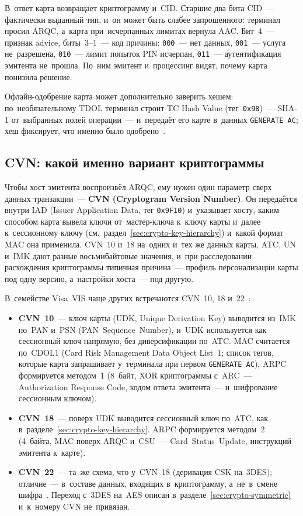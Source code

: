 В~ответ карта возвращает криптограмму и~CID. Старшие два бита CID~--- фактически
выданный тип, и~он может быть слабее запрошенного: терминал просил ARQC,
а~карта при~исчерпанных лимитах вернула AAC. Бит~4~--- признак advice, биты~3--1~---
код причины: \texttt{000}~--- нет данных, \texttt{001}~--- услуга не~разрешена,
\texttt{010}~--- лимит попыток PIN исчерпан, \texttt{011}~--- аутентификация
эмитента не~прошла. По~ним эмитент и~процессинг видят, почему карта понизила
решение.

Офлайн-одобрение карта может дополнительно заверить хешем: по~необязательному
TDOL терминал строит TC Hash Value (тег~\texttt{0x98})~--- SHA-1 от~выбранных полей
операции~--- и~передаёт его карте в~данных \texttt{GENERATE AC}; хеш фиксирует,
что именно было одобрено~\cite{emvco-book3}.

\subsection*{CVN: какой именно вариант криптограммы}

Чтобы хост эмитента воспроизвёл ARQC, ему нужен один параметр сверх данных
транзакции~--- \textbf{CVN (Cryptogram Version Number)}. Он передаётся внутри
IAD (Issuer Application Data, тег \texttt{0x9F10}) и~указывает хосту, каким
способом карта вывела ключи от~мастер-ключа к~ключу карты и~далее
к~сессионному ключу (см.~раздел~\ref{sec:crypto-key-hierarchy}) и~какой формат
MAC она применила. CVN~10 и~18 на~одних и~тех же данных карты, ATC, UN и~IMK
дают разные восьмибайтовые значения, и~при расследовании расхождения криптограммы
типичная причина~--- профиль персонализации карты под одну версию,
а~настройки хоста~--- под другую.

В~семействе Visa~VIS чаще других встречаются CVN~10, 18 и~22~\cite{thredd-chip-parameters}:

\begin{itemize}
  \item \textbf{CVN~10}~--- ключ карты (UDK, Unique Derivation Key) выводится
    из~IMK по~PAN и~PSN (PAN~Sequence~Number), и~UDK используется как
    сессионный ключ напрямую, без диверсификации по~ATC. MAC считается
    по~CDOL1 (Card Risk Management Data Object List~1; список тегов,
    которые карта запрашивает у~терминала при первом \texttt{GENERATE~AC}),
    ARPC формируется методом~1 (8~байт, XOR криптограммы с~ARC~---
      Authorization Response Code, кодом ответа эмитента~--- и~шифрование
    сессионным ключом).
  \item \textbf{CVN~18}~--- поверх UDK выводится сессионный ключ по~ATC, как
    в~разделе~\ref{sec:crypto-key-hierarchy}. ARPC формируется методом~2
    (4~байта, MAC поверх ARQC и~CSU~--- Card~Status~Update, инструкций
    эмитента к~карте).
  \item \textbf{CVN~22}~--- та~же схема, что у~CVN~18 (деривация CSK
    на~3DES); отличие~--- в~составе данных, входящих в~криптограмму,
    а~не~в~смене шифра~\cite{aws-payment-cryptography-visa}. Переход с~3DES
    на~AES описан в~разделе~\ref{sec:crypto-symmetric} и~к~номеру CVN
    не~привязан.
\end{itemize}

